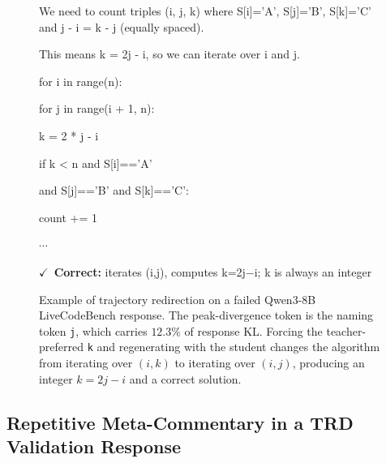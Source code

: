 \begin{figure}[ht]
\begin{minipage}[t]{0.48\linewidth}
\begin{tcolorbox}[colback=gray!8, colframe=gray!40, colbacktitle=gray!20, coltitle=black, boxrule=0.5pt, arc=1.5pt,
  left=5pt, right=5pt, top=4pt, bottom=4pt, title={\scriptsize\sffamily Pre-code reasoning trace}]
\ttfamily\scriptsize
We need to count triples (i, j, k) where
S[i]='A', S[j]='B', S[k]='C' and
j - i = k - j (equally spaced).\par\smallskip
This means \colorbox{green!20}{k} = 2j - i,
so we can iterate over i and j.
\end{tcolorbox}
\vspace{-4pt}
\begin{tcolorbox}[colback=gray!8, colframe=gray!40, colbacktitle=gray!20, coltitle=black, boxrule=0.5pt, arc=1.5pt,
  left=5pt, right=5pt, top=4pt, bottom=4pt, title={\scriptsize\sffamily Generated code}]
\ttfamily\scriptsize
for i in range(n):\par
\hspace*{1em}for j in range(i + 1, n):\par
\hspace*{2em}k = 2 * j - i\par
\hspace*{2em}if k < n and S[i]=='A'\par
\hspace*{3em}and S[j]=='B' and S[k]=='C':\par
\hspace*{3em}count += 1\par
$\cdots$
\end{tcolorbox}
\vspace{-4pt}
\begin{tcolorbox}[colback=green!5, colframe=green!40!black, boxrule=0.5pt, arc=1.5pt,
  left=5pt, right=5pt, top=3pt, bottom=3pt]
\scriptsize\textcolor{green!50!black}{$\boldsymbol{\checkmark}$~\textbf{Correct:} iterates (i,j), computes k=2j$-$i; k is always an integer}
\end{tcolorbox}
\end{minipage}
\caption{Example of trajectory redirection on a failed Qwen3-8B LiveCodeBench response. The peak-divergence token is the naming token \colorbox{red!20}{\small \texttt{j}}, which carries $12.3\%$ of response KL. Forcing the teacher-preferred \colorbox{green!20}{\small \texttt{k}} and regenerating with the student changes the algorithm from iterating over $(i,k)$ to iterating over $(i,j)$, producing an integer $k=2j-i$ and a correct solution.}
\label{fig:inversion-example}
\end{figure}

\subsection{Repetitive Meta-Commentary in a TRD Validation Response}
\label{app:trd-validation-example}

